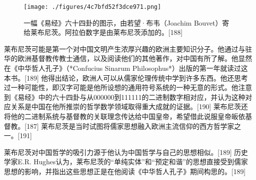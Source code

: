 \begin{figure}[ht]
\centering
\texttt{[image: ./figures/4c7bfd52f3dce971.png]}
\caption{一幅《易经》六十四卦的图示，由若望·布韦（Joachim Bouvet）寄给莱布尼茨。阿拉伯数字是由莱布尼茨添加的。[188]} \label{fig_LBNC_6}
\end{figure}
莱布尼茨可能是第一个对中国文明产生浓厚兴趣的欧洲主要知识分子。他通过与驻华的欧洲基督教传教士通信，以及阅读他们的其他著作，对中国有所了解。他显然在《中华哲人孔子》（*Confucius Sinarum Philosophus*）出版的第一年就读过这本书。[189] 他得出结论，欧洲人可以从儒家伦理传统中学到许多东西。他还思考过一种可能性，即汉字可能是他所设想的通用符号系统的一种无意的形式。他注意到《易经》中的六十四卦与从000000到111111的二进制数字相对应，并认为这种对应关系是中国在他所推崇的哲学数学领域取得重大成就的证据。[190] 莱布尼茨还将他的二进制系统与基督教的关联理念传达给中国皇帝，希望借此说服皇帝皈依基督教。[187] 莱布尼茨是当时试图将儒家思想融入欧洲主流信仰的西方哲学家之一。[191]

莱布尼茨对中国哲学的吸引力源于他认为中国哲学与自己的思想相似。[189] 历史学家E.R. Hughes认为，莱布尼茨的“单纯实体”和“预定和谐”的思想直接受到儒家思想的影响，并指出这些思想正是在他阅读《中华哲人孔子》期间构思的。[189]